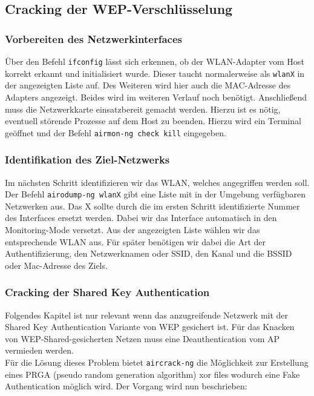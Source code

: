 \subsection{Cracking der WEP-Verschlüsselung}

	\subsubsection{Vorbereiten des Netzwerkinterfaces}
	Über den Befehl \colorbox{altgray}{\lstinline|ifconfig|} lässt sich erkennen, ob der WLAN-Adapter vom Host korrekt erkannt und initialisiert wurde. Dieser taucht normalerweise als \colorbox{altgray}{\lstinline|wlanX|} in der angezeigten Liste auf. Des Weiteren wird hier auch die MAC-Adresse des Adapters angezeigt. Beides wird im weiteren Verlauf noch benötigt.
	Anschließend muss die Netzwerkkarte einsatzbereit gemacht werden. Hierzu ist es nötig, eventuell
	störende Prozesse auf dem Host zu beenden. Hierzu wird ein Terminal geöffnet und der
	Befehl \colorbox{altgray}{\lstinline|airmon-ng check kill|} eingegeben.

	\subsubsection{Identifikation des Ziel-Netzwerks}
	Im nächsten Schritt identifizieren wir das WLAN, welches angegriffen werden soll. Der Befehl \colorbox{altgray}{\lstinline|airodump-ng wlanX|} gibt eine Liste mit in der Umgebung verfügbaren Netzwerken aus. Das X sollte durch die im ersten Schritt identifizierte Nummer des Interfaces ersetzt werden.
	Dabei wir das Interface automatisch in den Monitoring-Mode versetzt. Aus der angezeigten Liste wählen wir das entsprechende WLAN aus. Für später benötigen
	wir dabei die Art der Authentifizierung, den Netzwerknamen oder SSID, den Kanal und die BSSID oder Mac-Adresse des
	Ziels.

	\subsubsection{Cracking der Shared Key Authentication}
	Folgendes Kapitel ist nur relevant wenn das anzugreifende Netzwerk mit der Shared Key Authentication Variante von WEP gesichert ist. Für das Knacken von WEP-Shared-gesicherten Netzen muss eine Deauthentication vom AP vermieden werden. \\
	Für die Lösung dieses Problem bietet \colorbox{altgray}{\lstinline|aircrack-ng|} die Möglichkeit zur Erstellung eines PRGA (pseudo random generation algorithm) xor files wodurch eine Fake Authentication möglich wird. Der Vorgang wird nun beschrieben:

